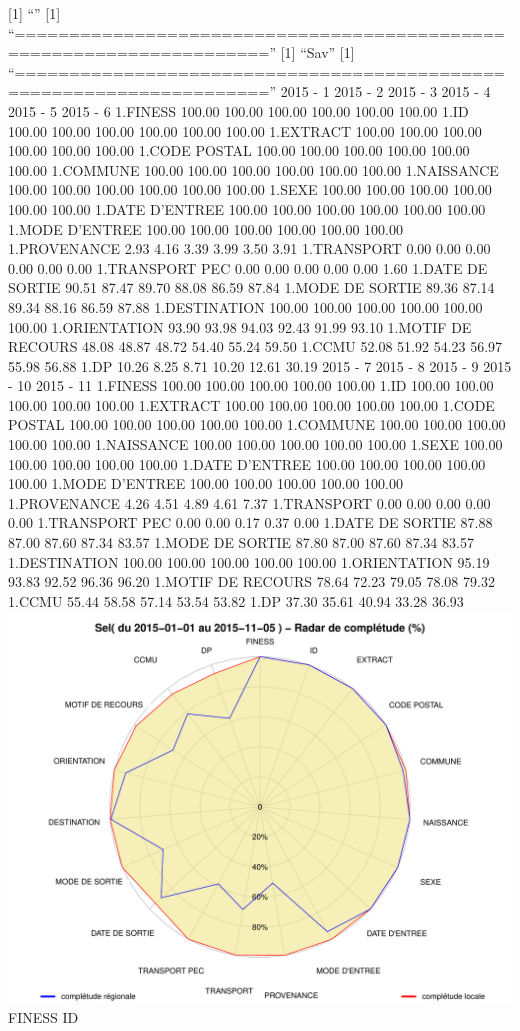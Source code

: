 \documentclass[]{article}
\begin{document}
{[}1{]} ``'' {[}1{]}
``=====================================================================''
{[}1{]} ``Sav'' {[}1{]}
``=====================================================================''
2015 - 1 2015 - 2 2015 - 3 2015 - 4 2015 - 5 2015 - 6 1.FINESS 100.00
100.00 100.00 100.00 100.00 100.00 1.ID 100.00 100.00 100.00 100.00
100.00 100.00 1.EXTRACT 100.00 100.00 100.00 100.00 100.00 100.00 1.CODE
POSTAL 100.00 100.00 100.00 100.00 100.00 100.00 1.COMMUNE 100.00 100.00
100.00 100.00 100.00 100.00 1.NAISSANCE 100.00 100.00 100.00 100.00
100.00 100.00 1.SEXE 100.00 100.00 100.00 100.00 100.00 100.00 1.DATE
D'ENTREE 100.00 100.00 100.00 100.00 100.00 100.00 1.MODE D'ENTREE
100.00 100.00 100.00 100.00 100.00 100.00 1.PROVENANCE 2.93 4.16 3.39
3.99 3.50 3.91 1.TRANSPORT 0.00 0.00 0.00 0.00 0.00 0.00 1.TRANSPORT PEC
0.00 0.00 0.00 0.00 0.00 1.60 1.DATE DE SORTIE 90.51 87.47 89.70 88.08
86.59 87.84 1.MODE DE SORTIE 89.36 87.14 89.34 88.16 86.59 87.88
1.DESTINATION 100.00 100.00 100.00 100.00 100.00 100.00 1.ORIENTATION
93.90 93.98 94.03 92.43 91.99 93.10 1.MOTIF DE RECOURS 48.08 48.87 48.72
54.40 55.24 59.50 1.CCMU 52.08 51.92 54.23 56.97 55.98 56.88 1.DP 10.26
8.25 8.71 10.20 12.61 30.19 2015 - 7 2015 - 8 2015 - 9 2015 - 10 2015 -
11 1.FINESS 100.00 100.00 100.00 100.00 100.00 1.ID 100.00 100.00 100.00
100.00 100.00 1.EXTRACT 100.00 100.00 100.00 100.00 100.00 1.CODE POSTAL
100.00 100.00 100.00 100.00 100.00 1.COMMUNE 100.00 100.00 100.00 100.00
100.00 1.NAISSANCE 100.00 100.00 100.00 100.00 100.00 1.SEXE 100.00
100.00 100.00 100.00 100.00 1.DATE D'ENTREE 100.00 100.00 100.00 100.00
100.00 1.MODE D'ENTREE 100.00 100.00 100.00 100.00 100.00 1.PROVENANCE
4.26 4.51 4.89 4.61 7.37 1.TRANSPORT 0.00 0.00 0.00 0.00 0.00
1.TRANSPORT PEC 0.00 0.00 0.17 0.37 0.00 1.DATE DE SORTIE 87.88 87.00
87.60 87.34 83.57 1.MODE DE SORTIE 87.80 87.00 87.60 87.34 83.57
1.DESTINATION 100.00 100.00 100.00 100.00 100.00 1.ORIENTATION 95.19
93.83 92.52 96.36 96.20 1.MOTIF DE RECOURS 78.64 72.23 79.05 78.08 79.32
1.CCMU 55.44 58.58 57.14 53.54 53.82 1.DP 37.30 35.61 40.94 33.28 36.93
\includegraphics{completude_files/figure-latex/finess-2.pdf} FINESS ID
\end{document}
